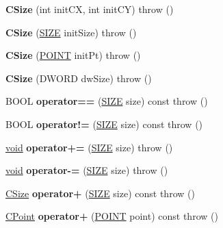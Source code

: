 \begin{DoxyCompactItemize}
\item 
\mbox{\label{class_c_size_ae429e736fca65dd9bb8c2d658a8c7ecc}} 
{\bfseries C\+Size} (int init\+CX, int init\+CY)  throw ()
\item 
\mbox{\label{class_c_size_a639c2514eb62fe3f4737b679cf424e4f}} 
{\bfseries C\+Size} (\hyperlink{structtag_s_i_z_e}{S\+I\+ZE} init\+Size)  throw ()
\item 
\mbox{\label{class_c_size_af7ae28c628495fd90a8d9d733676190d}} 
{\bfseries C\+Size} (\hyperlink{structtag_p_o_i_n_t}{P\+O\+I\+NT} init\+Pt)  throw ()
\item 
\mbox{\label{class_c_size_aec67777d2dfee1b3f9d001e0c0d7142a}} 
{\bfseries C\+Size} (D\+W\+O\+RD dw\+Size)  throw ()
\item 
\mbox{\label{class_c_size_ac928dd97dd0682b20fefba72e05764b6}} 
B\+O\+OL {\bfseries operator==} (\hyperlink{structtag_s_i_z_e}{S\+I\+ZE} size) const  throw ()
\item 
\mbox{\label{class_c_size_a79b5d2f916b1a8808966142207632e2c}} 
B\+O\+OL {\bfseries operator!=} (\hyperlink{structtag_s_i_z_e}{S\+I\+ZE} size) const  throw ()
\item 
\mbox{\label{class_c_size_a133f4e4e92c270c405c5d36cfdffcc9b}} 
\hyperlink{interfacevoid}{void} {\bfseries operator+=} (\hyperlink{structtag_s_i_z_e}{S\+I\+ZE} size)  throw ()
\item 
\mbox{\label{class_c_size_ae2b5f739821a46f4e280558ed950dac4}} 
\hyperlink{interfacevoid}{void} {\bfseries operator-\/=} (\hyperlink{structtag_s_i_z_e}{S\+I\+ZE} size)  throw ()
\item 
\mbox{\label{class_c_size_aec020a63f148360b09be34bb0b993c0f}} 
\hyperlink{class_c_size}{C\+Size} {\bfseries operator+} (\hyperlink{structtag_s_i_z_e}{S\+I\+ZE} size) const  throw ()
\item 
\mbox{\label{class_c_size_acb08bede3513f9de5d6eac8e87b0cf65}} 
\hyperlink{class_c_point}{C\+Point} {\bfseries operator+} (\hyperlink{structtag_p_o_i_n_t}{P\+O\+I\+NT} point) const  throw ()

\end{DoxyCompactItemize}
